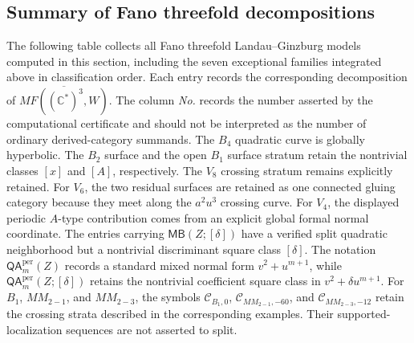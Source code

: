 \documentclass[11pt]{amsart}
\newcommand{\MBtwcat}[2]{\mathsf{MB}(#1;[#2])}
\newcommand{\QAper}[2]{\mathsf{QA}^{\mathrm{per}}_{#2}(#1)}
\newcommand{\QAtwist}[3]{\mathsf{QA}^{\mathrm{per}}_{#2}(#1;[#3])}
\begin{document}
\subsection*{Summary of Fano threefold decompositions}
The following table collects all Fano threefold Landau--Ginzburg models
computed in this section, including the seven exceptional families integrated
above in classification order.
Each entry records the corresponding decomposition of $\overline{MF((\mathbb{C}^*)^3,W)}$. The column
\emph{No.} records the number asserted by the computational certificate and should not be interpreted as the number of ordinary derived-category summands.
The $B_4$ quadratic curve is globally hyperbolic. The $B_2$ surface and the
open $B_1$ surface stratum retain the nontrivial classes $[x]$ and $[A]$,
respectively. The $V_8$ crossing stratum remains explicitly retained. For
$V_6$, the two residual surfaces are retained as one connected gluing
category because they meet along the $a^2u^3$ crossing curve. For $V_4$, the
displayed periodic $A$-type contribution comes from an explicit global formal
normal coordinate. The entries carrying
$\MBtwcat{Z}{\delta}$ have a verified split quadratic neighborhood but a
nontrivial discriminant square class $[\delta]$. The notation
$\QAper{Z}{m}$ records a standard mixed normal form $v^2+u^{m+1}$, while
$\QAtwist{Z}{m}{\delta}$ retains the nontrivial coefficient square class in
$v^2+\delta u^{m+1}$.
For $B_1$, $MM_{2-1}$, and $MM_{2-3}$, the symbols
$\mathcal C_{B_1,0}$, $\mathcal C_{MM_{2-1},-60}$, and
$\mathcal C_{MM_{2-3},-12}$ retain the crossing strata described in the
corresponding examples.  Their supported-localization sequences are not
asserted to split.
\end{document}
